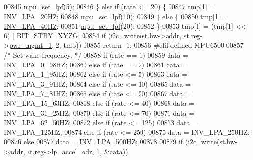 \begin{DoxyCode}
00845         \hyperlink{group___d_r_i_v_e_r_s_ga5661a9dee25152166769910767a2a93d}{mpu\_set\_lpf}(5);
00846     \} \textcolor{keywordflow}{else} \textcolor{keywordflow}{if} (rate <= 20) \{
00847         tmp[1] = \hyperlink{inv__mpu_8c_a23c3fcde795e5aa2b141232d490c9ca7accaaf47c58dfe32cbf2ffa11fdb83108}{INV\_LPA\_20HZ};
00848         \hyperlink{group___d_r_i_v_e_r_s_ga5661a9dee25152166769910767a2a93d}{mpu\_set\_lpf}(10);
00849     \} \textcolor{keywordflow}{else} \{
00850         tmp[1] = \hyperlink{inv__mpu_8c_a23c3fcde795e5aa2b141232d490c9ca7a798d2b86eafcf3fc7c7fe775f46cb4cb}{INV\_LPA\_40HZ};
00851         \hyperlink{group___d_r_i_v_e_r_s_ga5661a9dee25152166769910767a2a93d}{mpu\_set\_lpf}(20);
00852     \}
00853     tmp[1] = (tmp[1] << 6) | \hyperlink{inv__mpu_8c_a4e2ef22b94b90f9b83394dfe1f688ce4}{BIT\_STBY\_XYZG};
00854     \textcolor{keywordflow}{if} (\hyperlink{_i2_c_8c_ac0f145afe8d662af199043939f4398d6}{i2c\_write}(st.\hyperlink{structgyro__state__s_a5bac30a96752691e4cc723735060e360}{hw}->\hyperlink{structhw__s_a4c34a946600e9d68b6355d23f54d291b}{addr}, st.\hyperlink{structgyro__state__s_ae857e1285c583b7438a208edd691a38e}{reg}->\hyperlink{structgyro__reg__s_ad746a196c317f0f4d557a92b9eb98d34}{pwr\_mgmt\_1}, 2, tmp))
00855         \textcolor{keywordflow}{return} -1;
00856 \textcolor{preprocessor}{#elif defined MPU6500}
00857     \textcolor{comment}{/* Set wake frequency. */}
00858     \textcolor{keywordflow}{if} (rate == 1)
00859         data = INV\_LPA\_0\_98HZ;
00860     \textcolor{keywordflow}{else} \textcolor{keywordflow}{if} (rate == 2)
00861         data = INV\_LPA\_1\_95HZ;
00862     \textcolor{keywordflow}{else} \textcolor{keywordflow}{if} (rate <= 5)
00863         data = INV\_LPA\_3\_91HZ;
00864     \textcolor{keywordflow}{else} \textcolor{keywordflow}{if} (rate <= 10)
00865         data = INV\_LPA\_7\_81HZ;
00866     \textcolor{keywordflow}{else} \textcolor{keywordflow}{if} (rate <= 20)
00867         data = INV\_LPA\_15\_63HZ;
00868     \textcolor{keywordflow}{else} \textcolor{keywordflow}{if} (rate <= 40)
00869         data = INV\_LPA\_31\_25HZ;
00870     \textcolor{keywordflow}{else} \textcolor{keywordflow}{if} (rate <= 70)
00871         data = INV\_LPA\_62\_50HZ;
00872     \textcolor{keywordflow}{else} \textcolor{keywordflow}{if} (rate <= 125)
00873         data = INV\_LPA\_125HZ;
00874     \textcolor{keywordflow}{else} \textcolor{keywordflow}{if} (rate <= 250)
00875         data = INV\_LPA\_250HZ;
00876     \textcolor{keywordflow}{else}
00877         data = INV\_LPA\_500HZ;
00878 
00879     \textcolor{keywordflow}{if} (\hyperlink{_i2_c_8c_ac0f145afe8d662af199043939f4398d6}{i2c\_write}(st.\hyperlink{structgyro__state__s_a5bac30a96752691e4cc723735060e360}{hw}->\hyperlink{structhw__s_a4c34a946600e9d68b6355d23f54d291b}{addr}, st.\hyperlink{structgyro__state__s_ae857e1285c583b7438a208edd691a38e}{reg}->\hyperlink{structgyro__reg__s_a14a0bff136c827f3f58f619f8045788b}{lp\_accel\_odr}, 1, &data))

\end{DoxyCode}
